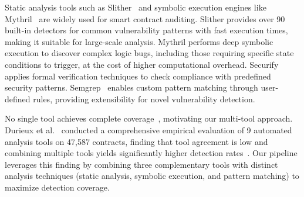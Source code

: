 Static analysis tools such as Slither~\cite{slither} and symbolic execution engines like Mythril~\cite{mythril} are widely used for smart contract auditing. Slither provides over 90 built-in detectors for common vulnerability patterns with fast execution times, making it suitable for large-scale analysis. Mythril performs deep symbolic execution to discover complex logic bugs, including those requiring specific state conditions to trigger, at the cost of higher computational overhead. Securify~\cite{securify} applies formal verification techniques to check compliance with predefined security patterns. Semgrep~\cite{semgrep} enables custom pattern matching through user-defined rules, providing extensibility for novel vulnerability detection.

No single tool achieves complete coverage~\cite{durieux2020empirical}, motivating our multi-tool approach. Durieux et al.~\cite{durieux2020empirical} conducted a comprehensive empirical evaluation of 9 automated analysis tools on 47,587 contracts, finding that tool agreement is low and combining multiple tools yields significantly higher detection rates~\cite{smartbugs, ren2021empirical}. Our pipeline leverages this finding by combining three complementary tools with distinct analysis techniques (static analysis, symbolic execution, and pattern matching) to maximize detection coverage.

